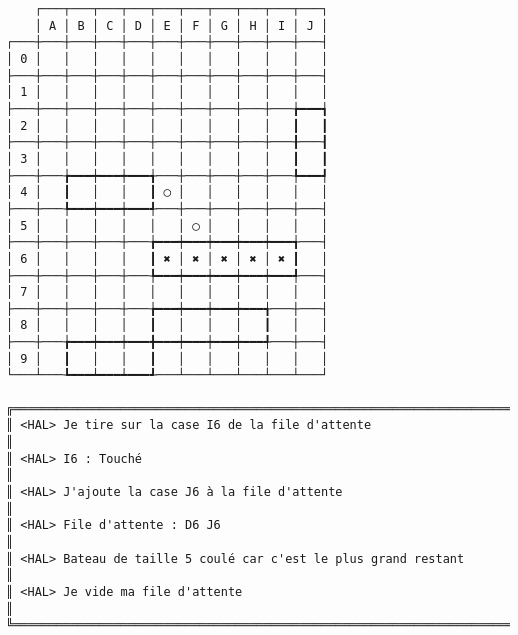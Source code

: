 {\scriptsize
\begin{verbatim}
    ┌───┬───┬───┬───┬───┬───┬───┬───┬───┬───┐
    │ A │ B │ C │ D │ E │ F │ G │ H │ I │ J │
┌───┼───┼───┼───┼───┼───┼───┼───┼───┼───┼───┤
│ 0 │   │   │   │   │   │   │   │   │   │   │
├───┼───┼───┼───┼───┼───┼───┼───┼───┼───┼───┤
│ 1 │   │   │   │   │   │   │   │   │   │   │
├───┼───┼───┼───┼───┼───┼───┼───┼───┼───╆━━━┪
│ 2 │   │   │   │   │   │   │   │   │   ┃   ┃
├───┼───┼───┼───┼───┼───┼───┼───┼───┼───╂───┨
│ 3 │   │   │   │   │   │   │   │   │   ┃   ┃
├───┼───╆━━━┿━━━┿━━━╅───┼───┼───┼───┼───╄━━━┩
│ 4 │   ┃   │   │   ┃ ◯ │   │   │   │   │   │
├───┼───╄━━━┿━━━┿━━━╃───┼───┼───┼───┼───┼───┤
│ 5 │   │   │   │   │   │ ◯ │   │   │   │   │
├───┼───┼───┼───┼───╆━━━┿━━━┿━━━┿━━━┿━━━╅───┤
│ 6 │   │   │   │   ┃ ✖ │ ✖ │ ✖ │ ✖ │ ✖ ┃   │
├───┼───┼───┼───┼───╄━━━┿━━━┿━━━┿━━━┿━━━╃───┤
│ 7 │   │   │   │   │   │   │   │   │   │   │
├───┼───┼───┼───┼───╆━━━┿━━━┿━━━┿━━━╅───┼───┤
│ 8 │   │   │   │   ┃   │   │   │   ┃   │   │
├───┼───╆━━━┿━━━┿━━━╋━━━┿━━━┿━━━┿━━━╃───┼───┤
│ 9 │   ┃   │   │   ┃   │   │   │   │   │   │
└───┴───┺━━━┷━━━┷━━━┹───┴───┴───┴───┴───┴───┘

╔══════════════════════════════════════════════════════════════════════════════════════════════════╗
║ <HAL> Je tire sur la case I6 de la file d'attente                                                ║
║ <HAL> I6 : Touché                                                                                ║
║ <HAL> J'ajoute la case J6 à la file d'attente                                                    ║
║ <HAL> File d'attente : D6 J6                                                                     ║
║ <HAL> Bateau de taille 5 coulé car c'est le plus grand restant                                   ║
║ <HAL> Je vide ma file d'attente                                                                  ║
╚══════════════════════════════════════════════════════════════════════════════════════════════════╝
\end{verbatim}}
\newpage

